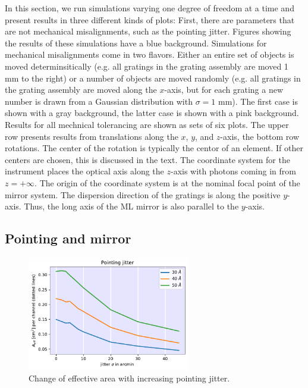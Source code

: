 \documentclass[]{spie}  %
\begin{document}
In this section, we run simulations varying one degree of freedom at a time and present results in three different kinds of plots: First, there are parameters that are not mechanical misalignments, such as the pointing jitter. Figures showing the results of these simulations have a blue background. Simulations for mechanical misalignments come in two flavors. Either an entire set of objects is moved determinsitically (e.g. all gratings in the grating assembly are moved 1 mm to the right) or a number of objects are moved randomly (e.g. all gratings in the grating assembly are moved along the $x$-axis, but for each grating a new number is drawn from a Gaussian distribution with $\sigma=1$ mm). The first case is shown with a gray background, the latter case is shown with a pink background. Results for all mechnical tolerancing are shown as sets of six plots. The upper row presents results from translations along the $x$, $y$, and $z$-axis, the bottom row rotations. The center of the rotation is typically the centor of an element. If other centers are chosen, this is discussed in the text. The coordinate system for the instrument places the optical axis along the $z$-axis with photons coming in from $z=+\infty$. The origin of the coordinate system is at the nominal focal point of the mirror system. The dispersion direction of the gratings is along the positive $y$-axis. Thus, the long axis of the ML mirror is also parallel to the $y$-axis.

\subsection{Pointing and mirror}
\begin{figure} [ht]
  \begin{center}
    \includegraphics[height=5cm]{jitter.pdf}
  \end{center}
  \caption
      { \label{fig:jitter}Change of effective area with increasing pointing jitter. 
}
\end{figure}
\end{document}

